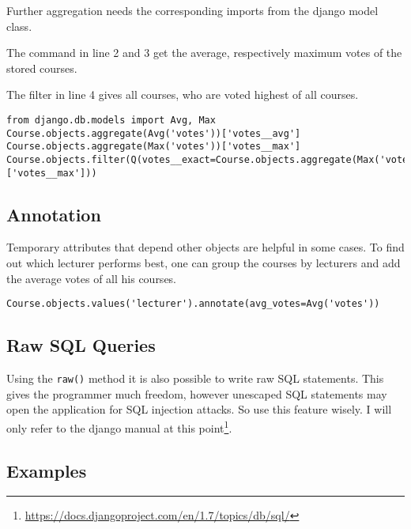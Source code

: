 Further aggregation needs the corresponding imports from the django model class.

The command in line 2 and 3 get the average, respectively maximum votes of the stored courses.

The filter in line 4 gives all courses, who are voted highest of all courses.
\begin{lstlisting}[style=Python, caption=Average and Maximum values of objects, label=lst:objects_aggregations]
from django.db.models import Avg, Max
Course.objects.aggregate(Avg('votes'))['votes__avg']
Course.objects.aggregate(Max('votes'))['votes__max']
Course.objects.filter(Q(votes__exact=Course.objects.aggregate(Max('votes'))['votes__max']))
\end{lstlisting}

\subsection{Annotation}

Temporary attributes that depend other objects are helpful in some cases. To find out which lecturer performs best, one can group the courses by lecturers and add the average votes of all his courses.
\begin{lstlisting}[style=Python, caption=Annotating objects, label=lst:objects_annotations]
Course.objects.values('lecturer').annotate(avg_votes=Avg('votes'))
\end{lstlisting}

\subsection{Raw SQL Queries}
Using the \lstinline|raw()| method it is also possible to write raw SQL statements. This gives the programmer much freedom, however unescaped SQL statements may open the application for SQL injection attacks. So use this feature wisely. I will only refer to the django manual at this point\footnote{\url{https://docs.djangoproject.com/en/1.7/topics/db/sql/}}.


\subsection{Examples}

